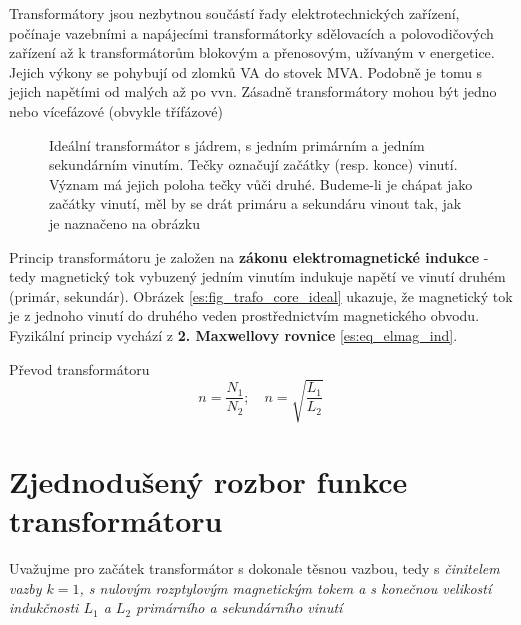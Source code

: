     Transformátory jsou nezbytnou součástí řady elektrotechnických zařízení, počínaje vazebními a napájecími 
    transformátorky sdělovacích a polovodičových zařízení až k transformátorům blokovým a přenosovým, 
    užívaným v energetice. Jejich výkony se pohybují od zlomků VA do stovek MVA. Podobně je tomu s jejich 
    napětími od malých až po vvn. Zásadně transformátory  mohou být jedno nebo vícefázové (obvykle třífázové)

    \begin{figure}[ht!]
      \centering
      \newline
      \caption{Ideální transformátor s jádrem, s jedním primárním a jedním sekundárním 
               vinutím. Tečky označují začátky (resp. konce) vinutí. Význam má jejich poloha tečky vůči
               druhé. Budeme-li je chápat jako začátky vinutí, měl by se drát primáru a sekundáru
               vinout tak, jak je naznačeno na obrázku}
      \label{es:fig_trafo_ideal}
    \end{figure}
    Princip transformátoru je založen na \textbf{zákonu elektromagnetické indukce} - tedy magnetický tok 
    vybuzený jedním vinutím indukuje napětí ve vinutí druhém (primár, sekundár). Obrázek 
    \ref{es:fig_trafo_core_ideal} ukazuje, že magnetický tok je z jednoho vinutí do druhého veden     
    prostřednictvím magnetického obvodu. Fyzikální princip vychází z \textbf{2. Maxwellovy
    rovnice} \ref{es:eq_elmag_ind}.

    Převod transformátoru
    \begin{equation}\label{es:eq_turn_ratio}
        n = \frac{N_1}{N_2}; \quad n=\sqrt{\frac{L_1}{L_2}}
    \end{equation}
    
  \section{Zjednodušený rozbor funkce transformátoru}\label{ES:kap_simple_rozbor_trafa}
    Uvažujme pro začátek transformátor s dokonale těsnou vazbou, tedy s \emph{činitelem vazby
    $k=1$, s nulovým rozptylovým magnetickým tokem a s konečnou velikostí indukčnosti $L_1$ a $L_2$
    primárního a sekundárního vinutí}

